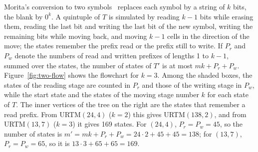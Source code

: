 \documentclass{article}
\theoremstyle{definition}
\theoremstyle{remark}
\begin{document}
Morita's conversion to two symbols~\cite[Sect.~5.3.3]{Morita17} replaces each symbol by a string of $k$ bits, the blank by $0^k$.
A quintuple of $T$ is simulated by reading $k-1$ bits while erasing them, reading the last bit and writing the last bit of the new symbol, writing the remaining bits while moving back, and moving $k-1$ cells in the direction of the move; the states remember the prefix read or the prefix still to write.
If $P_r$ and $P_w$ denote the numbers of read and written prefixes of lengths 1 to $k-1$, summed over the states, the number of states of $T'$ is at most $mk+P_r+P_w$.
Figure~\ref{fig:two-flow} shows the flowchart for $k=3$. Among the shaded boxes, the states of the reading stage are counted in $P_r$ and those of the writing stage in $P_w$, while the start state and the states of the moving stage number $k$ for each state of $T$. The inner vertices of the tree on the right are the states that remember a read prefix.
From URTM$(24,4)$ ($k=2$) this gives URTM$(138,2)$, and from URTM$(13,7)$ ($k=3$) it gives 169 states.
For $(24,4)$, $P_r=P_w=45$, so the number of states is $m'=mk+P_r+P_w=24\cdot 2+45+45=138$; for $(13,7)$, $P_r=P_w=65$, so it is $13\cdot 3+65+65=169$.
\end{document}
